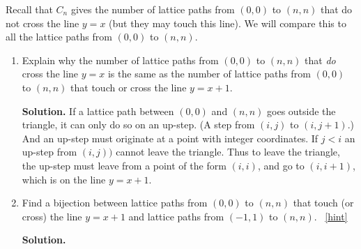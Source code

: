 \documentclass{book}
\begin{document}
\setcounter{project}{182}
\addtocounter{project}{-1}
\begin{activity}[]\label{activity-175}
\hypertarget{p-1078}{}%
Recall that \(C_n\) gives the number of lattice paths from \((0,0)\) to \((n,n)\) that do not cross the line \(y = x\) (but they may touch this line).  We will compare this to all the lattice paths from \((0,0)\) to \((n,n)\).%
\begin{enumerate}[font=\bfseries,label=(\alph*),ref=\alph*]
\item\label{task-195} \hypertarget{p-1079}{}%
Explain why the number of lattice paths from \((0,0)\) to \((n,n)\) that \emph{do} cross the line \(y = x\) is the same as the number of lattice paths from \((0,0)\) to \((n,n)\) that touch or cross the line \(y = x + 1\).%
\par\smallskip%
\noindent\textbf{Solution.}\hypertarget{solution-111}{}\quad%
\hypertarget{p-1080}{}%
If a lattice path between \((0,0)\) and \((n,n)\) goes outside the triangle, it can only do so on an up-step. (A step from \((i,j)\) to \((i,j+1)\).) And an up-step must originate at a point with integer coordinates. If \(j\lt i\) an up-step from \((i,j))\) cannot leave the triangle. Thus to leave the triangle, the up-step must leave from a point of the form \((i,i)\), and go to \((i,i+1)\), which is on the line \(y=x+1\).%
\item\label{task-196} \hypertarget{p-1081}{}%
Find a bijection between lattice paths from \((0,0)\) to \((n,n)\) that touch (or cross) the line \(y=x+1\) and lattice paths from \((-1,1)\) to \((n,n)\).%
~\hfill{\tiny\hyperlink{a-182.b}{[hint]}\hypertarget{q-182.b}{}}\par\smallskip%
\noindent\textbf{Solution.}\hypertarget{solution-112}{}\quad%
\hypertarget{p-1083}{}%

\end{enumerate}
\end{activity}
\end{document}
